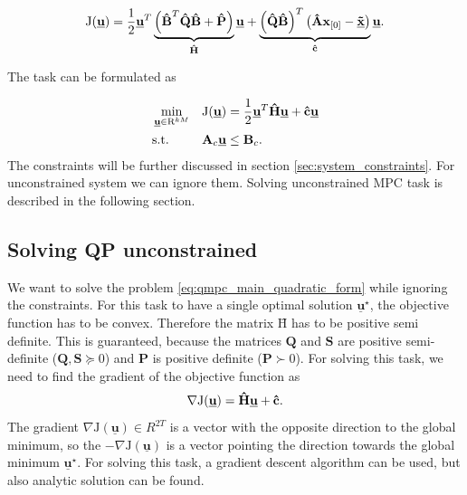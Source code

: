 \documentclass[a4paper,11pt,titlepage]{article}
\newcommand{\uvec}{\textbf{\underline{u}}}
\newcommand{\macJ}{\mathrm{J}(\uvec)}
\begin{document}
\begin{equation}
\mathrm{J}(\underline{\textbf{u}}) = \frac{1}{2}\uvec^T\underbrace{\left(\textbf{\^B}^T\textbf{\^Q}\textbf{\^B} + \textbf{\^P}\right)}_{\textbf{\^H}}\uvec + \underbrace{\left(\textbf{\^Q}\textbf{\^B}\right)^T\left(\textbf{\^A}\textbf{x}_{[0]} - \textbf{\underline{\~x}}\right)}_{\textbf{\^c}}\uvec.
\label{eq:mpc_objective_large}
\end{equation}

The task can be formulated as

\begin{equation}
\label{eq:qmpc_main_quadratic_form}
\begin{aligned}
& \min_{\uvec \in \mathrm{R}^{kM}}
& & \mathrm{J}(\uvec) = \frac{1}{2}\uvec^T\textbf{\^H}\uvec + \textbf{\^c} \uvec\\
& \text{s.t.}
& & \textbf{A}_c \uvec \leq \textbf{B}_c.
\end{aligned}
\end{equation}
The constraints will be further discussed in section \ref{sec:system_constraints}. For unconstrained system we can ignore them. Solving unconstrained MPC task is described in the following section.

\subsection{Solving QP unconstrained}
We want to solve the problem \ref{eq:qmpc_main_quadratic_form} while ignoring the constraints. For this task to have a single optimal solution $\underline{\textbf{u}}^{\star}$, the objective function has to be convex. Therefore the matrix $\textbf{\^H}$ has to be positive semi definite. This is guaranteed, because the matrices  $\textbf{Q}$ and $\textbf{S}$ are positive semi-definite ($\textbf{Q}, \textbf{S} \succeq 0$) and $\textbf{P}$ is positive definite ($\textbf{P} \succ 0$). For solving this task, we need to find the gradient of the objective function \cite{zometa2012implementation} as
\begin{equation}
\label{eq:J_grad}
\nabla\macJ = \textbf{\^H}\uvec + \textbf{\^c}.
\end{equation}
The gradient $\nabla\mathrm{J}(\underline{\textbf{u}}) \in R^{2T}$ is a vector with the opposite direction to the global minimum, so the $-\nabla\mathrm{J}(\underline{\textbf{u}})$ is a vector pointing the direction towards the global minimum $\underline{\textbf{u}}^{\star}$. For solving this task, a gradient descent algorithm can be used, but also analytic solution can be found.  
\end{document}
